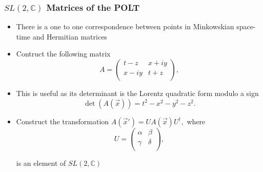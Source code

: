 \documentclass[10pt,a4paper]{beamer}
\begin{document}
\begin{frame}
\frametitle{$SL(2,\mathbb{C})$ Matrices of the POLT}
\begin{itemize}
\item<1->{There is a one to one correspondence between points in Minkowskian space-time and Hermitian matrices} 
\item<2->{Contruct the following matrix 
\begin{equation*}
A = 
\left( 
\begin{array}{cc}
t-z    & x + i y \\
x - iy & t+z \\
\end{array} 
\right),
\end{equation*}}
\item<3->{This is useful as its determinant is the Lorentz quadratic form modulo a sign $$\det(A(\vec{x})) = t^2 - x^2 - y^2 - z^2.$$}
\item<4->{Construct the transformation $A(\vec{x}') = U A(\vec{x}) U^{\dagger},$ where 
\begin{equation*} 
U = \left( 
\begin{array}{cc}
\alpha & \beta \\
\gamma & \delta \\
\end{array}
\right),
\end{equation*}

\noindent is an element of $SL(2,\mathbb{C})$}
\end{itemize}

\end{frame}
\end{document}
